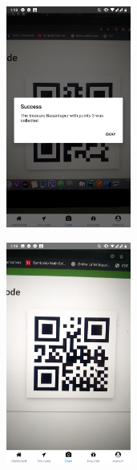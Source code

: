 \documentclass[12pt, a4paper, oneside]{article}
\begin{document}
\begin{figure}[H]
\begin{subfigure}{.5\textwidth}
    \centering
    \includegraphics[width=0.45\textwidth]{test-evidences/treasure/c.png}
    \caption{}
\end{subfigure}%
\begin{subfigure}{.5\textwidth}
    \centering
    \includegraphics[width=0.45\textwidth]{test-evidences/treasure/d.png}
    \caption{}
\end{subfigure}


\end{figure}
\end{document}
